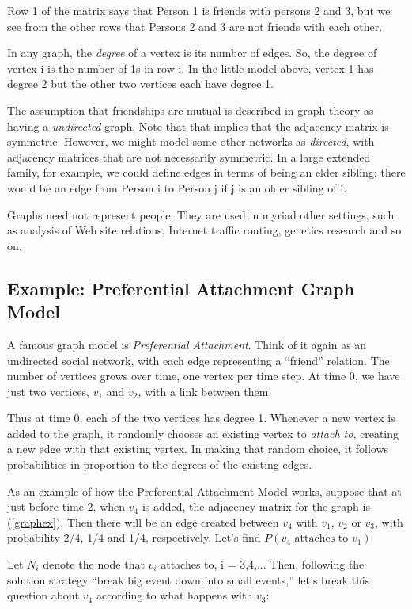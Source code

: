 Row 1 of the matrix says that Person 1 is friends with persons 2 and 3,
but we see from the other rows that Persons 2 and 3 are not friends with
each other.

In any graph, the {\it degree} of a vertex is its number of edges.  So,
the degree of vertex i is the number of 1s in row i.  In the little
model above, vertex 1 has degree 2 but the other two vertices each have
degree 1.

The assumption that friendships are mutual is described in graph theory
as having a {\it undirected} graph.  Note that that implies that the
adjacency matrix is symmetric.  However, we might model some other
networks as {\it directed}, with adjacency matrices that are not
necessarily symmetric.  In a large extended family, for example, we
could define edges in terms of being an elder sibling; there would be an
edge from Person i to Person j if j is an older sibling of i.

Graphs need not represent people.  They are used in myriad other
settings, such as analysis of Web site relations, Internet traffic
routing, genetics research and so on.

\subsection{Example:  Preferential Attachment Graph Model}
\label{prefattach}

A famous graph model is {\it Preferential Attachment}.  Think of it
again as an undirected social network, with each edge representing a
``friend'' relation.  The number of vertices grows over time, one vertex
per time step.  At time 0, we have just two vertices, $v_1$ and $v_2$,
with a link between them.  

Thus at time 0, each of the two vertices has degree 1.  Whenever a new
vertex is added to the graph, it randomly chooses an existing vertex to
{\it attach to}, creating a new edge with that existing vertex.  In
making that random choice, it follows probabilities in proportion to the
degrees of the existing edges.


As an example of how the Preferential Attachment Model works, suppose
that at just before time 2, when $v_4$ is added, the adjacency matrix
for the graph is (\ref{graphex}).  Then there will be an edge created
between $v_4$ with $v_1$, $v_2$ or $v_3$, with probability 2/4, 1/4 and
1/4, respectively.  Let's find $P(v_4 \textrm{ attaches to } v_1)$

Let $N_i$ denote the node that $v_i$ attaches to, i = 3,4,...
Then, following the solution strategy ``break big event down into small
events,'' let's break this question about $v_4$ according to what
happens with $v_3$:

